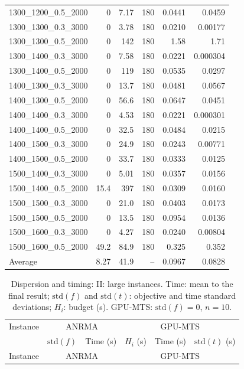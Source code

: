 \begin{landscape}
\begin{longtable}{lrrrrr}
1300\_1200\_0.5\_2000 & 0 & 7.17 & 180 & 0.0441 & 0.0459\\
1300\_1300\_0.3\_3000 & 0 & 3.78 & 180 & 0.0210 & 0.00177\\
1300\_1300\_0.5\_2000 & 0 & 142 & 180 & 1.58 & 1.71\\
1300\_1400\_0.3\_3000 & 0 & 7.58 & 180 & 0.0221 & 0.000304\\
1300\_1400\_0.5\_2000 & 0 & 119 & 180 & 0.0535 & 0.0297\\
1400\_1300\_0.3\_3000 & 0 & 13.7 & 180 & 0.0481 & 0.0567\\
1400\_1300\_0.5\_2000 & 0 & 56.6 & 180 & 0.0647 & 0.0451\\
1400\_1400\_0.3\_3000 & 0 & 4.53 & 180 & 0.0221 & 0.000301\\
1400\_1400\_0.5\_2000 & 0 & 32.5 & 180 & 0.0484 & 0.0215\\
1400\_1500\_0.3\_3000 & 0 & 24.9 & 180 & 0.0243 & 0.00771\\
1400\_1500\_0.5\_2000 & 0 & 33.7 & 180 & 0.0333 & 0.0125\\
1500\_1400\_0.3\_3000 & 0 & 5.01 & 180 & 0.0357 & 0.0156\\
1500\_1400\_0.5\_2000 & 15.4 & 397 & 180 & 0.0309 & 0.0160\\
1500\_1500\_0.3\_3000 & 0 & 21.0 & 180 & 0.0403 & 0.0173\\
1500\_1500\_0.5\_2000 & 0 & 13.5 & 180 & 0.0954 & 0.0136\\
1500\_1600\_0.3\_3000 & 0 & 4.27 & 180 & 0.0240 & 0.00804\\
1500\_1600\_0.5\_2000 & 49.2 & 84.9 & 180 & 0.325 & 0.352\\
\midrule
Average & 8.27 & 41.9 & -- & 0.0967 & 0.0828\\
\end{longtable}\clearpage
\fontsize{9}{10.5}\selectfont\setlength{\tabcolsep}{4pt}\renewcommand{\arraystretch}{.88}
\begin{longtable}{lrrrrr}
\caption{Dispersion and timing: II: large instances. Time: mean to the final result; $\mathrm{std}(f)$ and $\mathrm{std}(t)$: objective and time standard deviations; $H_i$: budget (s). GPU-MTS: $\mathrm{std}(f)=0$, $n=10$.}\\
\toprule
Instance & \multicolumn{2}{c}{ANRMA} & \multicolumn{3}{c}{GPU-MTS}\\
 & $\mathrm{std}(f)$ & Time (s) & $H_i$ (s) & Time (s) & $\mathrm{std}(t)$ (s)\\
\midrule\endfirsthead
Instance & \multicolumn{2}{c}{ANRMA} & \multicolumn{3}{c}{GPU-MTS}\\

\end{longtable}
\end{landscape}

